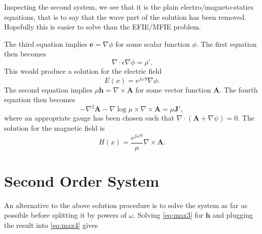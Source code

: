 \documentclass{article}
\theoremstyle{plain}
\begin{document}
Inspecting the second system, we see that it is the plain electro/magneto-statics equations, that is to say that the wave part of the solution has been removed. Hopefully this is easier to solve than the EFIE/MFIE problem.

The third equation implies $\mathbf{e} = \nabla\phi$ for some scalar function $\phi$. The first equation then becomes
\begin{equation}
	\nabla\cdot\epsilon\nabla\phi = \rho'.
\end{equation}
This would produce a solution for the electric field
\begin{equation}
	E(x) = e^{j\omega S}\nabla\phi.
\end{equation}
The second equation implies $\mu\mathbf{h} = \nabla\times\mathbf{A}$ for some vector function $\mathbf{A}$. The fourth equation then becomes
\begin{equation}
	-\nabla^2\mathbf{A} -\nabla\log{\mu}\times\nabla\times\mathbf{A} = \mu\mathbf{J}',
\end{equation}
where an appropriate gauge has been chosen such that $\nabla\cdot\left(\mathbf{A}+\nabla\psi\right)=0$. The solution for the magnetic field is
\begin{equation}
	H(x) = \frac{e^{j\omega S}}{\mu}\nabla\times\mathbf{A}.
\end{equation}

\section{Second Order System}

An alternative to the above solution procedure is to solve the system as far as possible before splitting it by powers of $\omega$. Solving \eqref{eq:max3} for $\mathbf{h}$ and plugging the result into \eqref{eq:max4} gives
\end{document}
